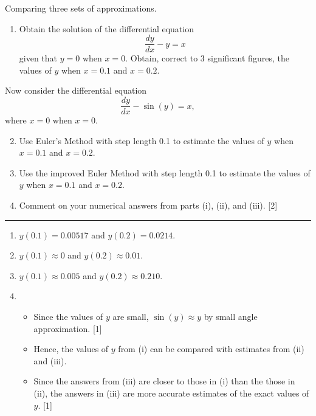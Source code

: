 \documentclass[oneside]{book}
\begin{document}
\begin{example}{Comparing three sets of approximations.}{}
  \begin{enumerate}[label=(\roman*)]
    \item Obtain the solution of the differential equation 
    \[\frac{dy}{dx}-y=x\]
    given that \(y=0\) when \(x=0\). Obtain, correct to 3 significant figures, the values of \(y\) when \(x=0.1\) and \(x=0.2\).
  \end{enumerate}
  Now consider the differential equation
  \[\frac{dy}{dx}-\sin(y)=x,\]
  where \(x=0\) when \(x=0\).
  \begin{enumerate}[label=(\roman*)]
    \setcounter{enumi}{1}
    \item Use Euler's Method with step length 0.1 to estimate the values of \(y\) when \(x=0.1\) and \(x=0.2\).
    \item Use the improved Euler Method with step length 0.1 to estimate the values of \(y\) when \(x=0.1\) and \(x=0.2\).
    \item Comment on your numerical answers from parts (i), (ii), and (iii). \hspace*{\fill} [2]
  \end{enumerate}
  \rule{20cm-137.0549pt}{0.05mm}
  \begin{enumerate}[label=(\roman*)]
    \item \(y(0.1)=0.00517\) and \(y(0.2)=0.0214\).
    \item \(y(0.1)\approx 0\) and \(y(0.2)\approx 0.01\).
    \item \(y(0.1)\approx 0.005\) and \(y(0.2)\approx 0.210\).
    \item 
    \begin{itemize}
      \item Since the values of \(y\) are small, \(\sin(y)\approx y\) by small angle approximation. \hspace*{\fill} [1]
      \item Hence, the values of \(y\) from (i) can be compared with estimates from (ii) and (iii). 
      \item Since the answers from (iii) are closer to those in (i) than the those in (ii), the answers in (iii) are more accurate estimates of the exact values of \(y\). \hspace*{\fill} [1]
    \end{itemize}
  \end{enumerate}
\end{example}
\end{document}
